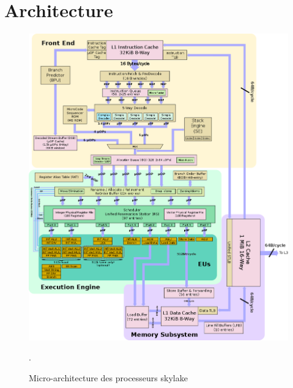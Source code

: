 \chapter{Architecture}
\label{annexe:architecture}




\begin{figure}[hbtp]
    \center
    \includegraphics[]{images/cpu_skylake_architecture.png}
    \caption{\label{pic_cpu_skylake_architecture}Micro-architecture des processeurs skylake}.
\end{figure}